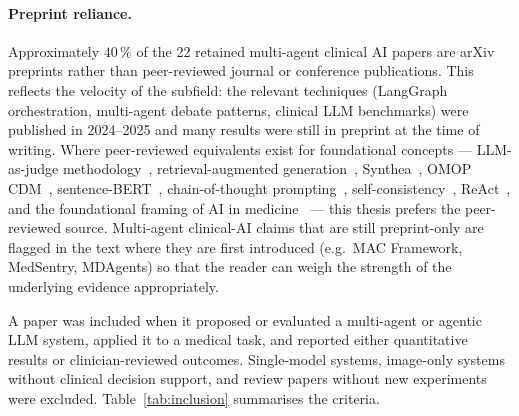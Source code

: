 \paragraph{Preprint reliance.}
\label{sec:preprint_caveat}
Approximately $40\,\%$ of the 22 retained multi-agent clinical AI
papers are arXiv preprints rather than peer-reviewed journal or
conference publications. This reflects the velocity of the subfield:
the relevant techniques (LangGraph orchestration, multi-agent debate
patterns, clinical LLM benchmarks) were published in 2024--2025 and
many results were still in preprint at the time of writing. Where
peer-reviewed equivalents exist for foundational concepts ---
LLM-as-judge methodology~\cite{Zheng2023JudgeLLM},
retrieval-augmented generation~\cite{Lewis2020RAG},
Synthea~\cite{Walonoski2018Synthea},
OMOP CDM~\cite{Hripcsak2015OHDSI},
sentence-BERT~\cite{Reimers2019SentenceBERT},
chain-of-thought prompting~\cite{Wei2022CoT},
self-consistency~\cite{Wang2023SelfConsistency},
ReAct~\cite{Yao2023ReAct},
and the foundational framing of AI in
medicine~\cite{Topol2019HighPerformance} --- this thesis prefers the
peer-reviewed source. Multi-agent clinical-AI claims that are still
preprint-only are flagged in the text where they are first
introduced (e.g.\ MAC Framework, MedSentry, MDAgents) so that the
reader can weigh the strength of the underlying evidence
appropriately.

A paper was included when it proposed or evaluated a multi-agent or agentic
LLM system, applied it to a medical task, and reported either quantitative
results or clinician-reviewed outcomes. Single-model systems, image-only
systems without clinical decision support, and review papers without new
experiments were excluded. Table~\ref{tab:inclusion} summarises the criteria.

